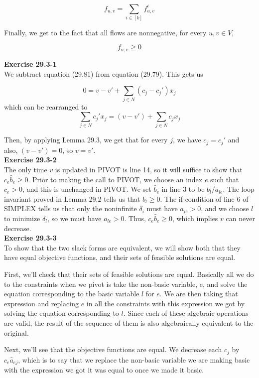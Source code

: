\documentclass{article}
\begin{document}
\[
f_{u,v} = \sum_{i\in[k]} f_{u,v}^i
\]

Finally, we get to the fact that all flows are nonnegative, for every $u,v\in V$,

\[
f_{u,v} \ge 0
\]



\noindent\textbf{Exercise 29.3-1}\\

We subtract equation (29.81) from equation (29.79). This gets us

\[
0 = v - v' + \sum_{j\in N} (c_j - c_j') x_j
\]
which can be rearranged to
\[
\sum_{j\in N} c_j' x_j = (v-v') + \sum_{j\in N} c_j x_j
\]

Then, by applying Lemma 29.3, we get that for every $j$, we have $c_j = c_j'$ and also, $(v-v')=0$, so $v= v'$.\\


\noindent\textbf{Exercise 29.3-2}\\

The only time $v$ is updated in PIVOT is line 14, so it will suffice to show that $c_e\hat{b}_e \geq 0$. Prior to making the call to PIVOT, we choose an index $e$ such that $c_e > 0$, and this is unchanged in PIVOT.  We set $\hat{b}_e$ in line 3 to be $b_l / a_{le}$.  The loop invariant proved in Lemma 29.2 tells us that $b_l \geq 0$. The if-condition of line 6 of SIMPLEX tells us that only the noninfinite $\delta_i$ must have $a_{ie} > 0$, and we choose $l$ to minimize $\delta_l$, so we must have $a_{le} > 0$.  Thus, $c_e\hat{b}_e \geq 0$, which implies $v$ can never decrease. \\

\noindent\textbf{Exercise 29.3-3}\\

To show that the two slack forms are equivalent, we will show both that they have equal objective functions, and their sets of feasible solutions are equal.

First, we'll check that their sets of feasible solutions are equal. Basically all we do to the constraints when we pivot is take the non-basic variable, e, and solve the equation corresponding to the basic variable $l$ for $e$. We are then taking that expression and replacing $e$ in all the constraints with this expression we got by solving the equation corresponding to $l$. Since each of these algebraic operations are valid, the result of the sequence of them is also algebraically equivalent to the original.

Next, we'll see that the objective functions are equal. We decrease each $c_j$ by $c_e \hat{a}_{ej}$, which is to say that we replace the non-basic variable we are making basic with the expression we got it was equal to once we made it basic.
\end{document}

